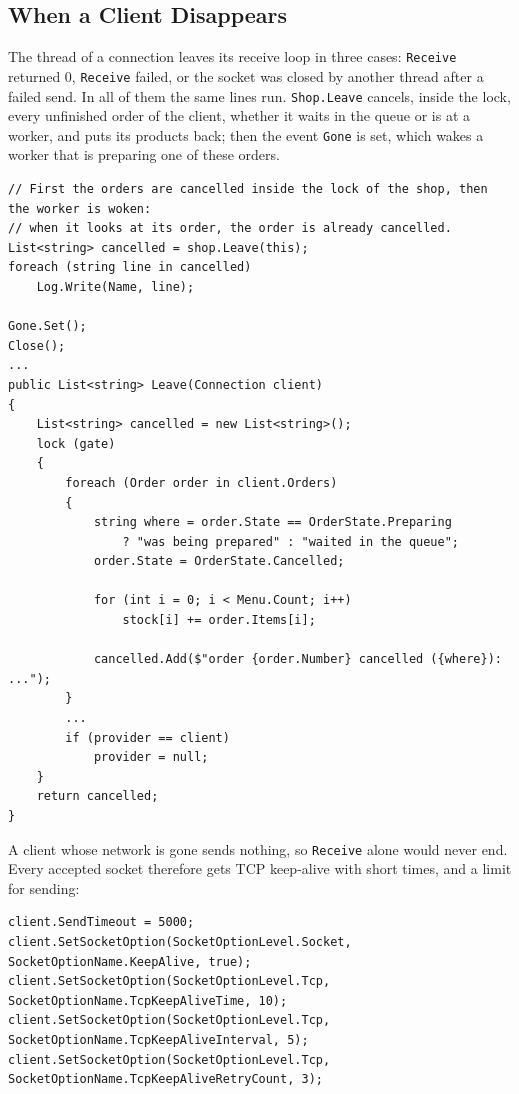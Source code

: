 \documentclass[12pt,a4paper]{article}
\begin{document}
\subsection{When a Client Disappears}
\label{sec:leave}

The thread of a connection leaves its receive loop in three cases: \texttt{Receive} returned 0, \texttt{Receive} failed, or the socket was closed by another thread after a failed send. In all of them the same lines run. \texttt{Shop.Leave} cancels, inside the lock, every unfinished order of the client, whether it waits in the queue or is at a worker, and puts its products back; then the event \texttt{Gone} is set, which wakes a worker that is preparing one of these orders.

\begin{lstlisting}[style=csharp,caption={The end of Connection.Run and Shop.Leave}]
// First the orders are cancelled inside the lock of the shop, then the worker is woken:
// when it looks at its order, the order is already cancelled.
List<string> cancelled = shop.Leave(this);
foreach (string line in cancelled)
    Log.Write(Name, line);

Gone.Set();
Close();
...
public List<string> Leave(Connection client)
{
    List<string> cancelled = new List<string>();
    lock (gate)
    {
        foreach (Order order in client.Orders)
        {
            string where = order.State == OrderState.Preparing
                ? "was being prepared" : "waited in the queue";
            order.State = OrderState.Cancelled;

            for (int i = 0; i < Menu.Count; i++)
                stock[i] += order.Items[i];

            cancelled.Add($"order {order.Number} cancelled ({where}): ...");
        }
        ...
        if (provider == client)
            provider = null;
    }
    return cancelled;
}
\end{lstlisting}

A client whose network is gone sends nothing, so \texttt{Receive} alone would never end. Every accepted socket therefore gets TCP keep-alive with short times, and a limit for sending:

\begin{lstlisting}[style=csharp,caption={Options of an accepted socket (Server.Prepare)}]
client.SendTimeout = 5000;
client.SetSocketOption(SocketOptionLevel.Socket, SocketOptionName.KeepAlive, true);
client.SetSocketOption(SocketOptionLevel.Tcp, SocketOptionName.TcpKeepAliveTime, 10);
client.SetSocketOption(SocketOptionLevel.Tcp, SocketOptionName.TcpKeepAliveInterval, 5);
client.SetSocketOption(SocketOptionLevel.Tcp, SocketOptionName.TcpKeepAliveRetryCount, 3);
\end{lstlisting}
\end{document}
